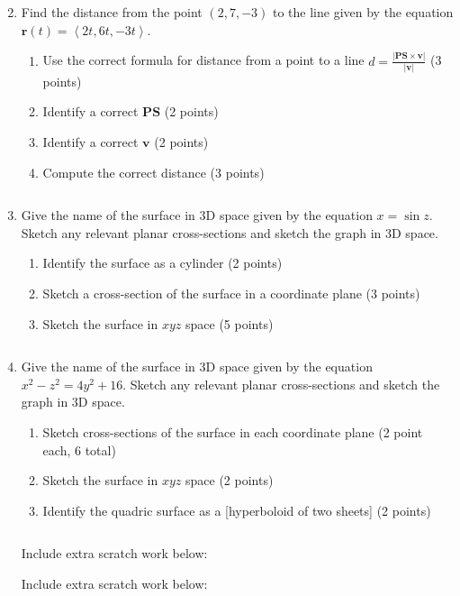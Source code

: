 \documentclass[12pt]{article}
\newcommand{\up}{$~$\vspace*{-0.7in}}
\newcommand{\liner}{\noindent\underline{\hspace*{7in}}}
\renewcommand{\vec}{\mathbf}
\newcommand{\<}{\left<}
\renewcommand{\>}{\right>}
\begin{document}
\begin{enumerate}
\vspace*{7.5in}

\liner
\newpage\up

\item Find the distance from the point $(2,7,-3)$ to the line given by the equation $\vec{r}(t)=\<2t,6t,-3t\>$.

\begin{enumerate}
\item Use the correct formula for distance from a point to a line $d = \frac{|\vec{PS}\times\vec{v}|}{|\vec{v}|}$ (3 points)
\item Identify a correct $\vec{PS}$ (2 points) 
\item Identify a correct $\vec{v}$ (2 points) 
\item Compute the correct distance (3 points)
\end{enumerate}

\vspace*{7.5in}

\liner
\newpage\up

\item Give the name of the surface in 3D space given by the equation $x=\sin z$. Sketch any relevant planar cross-sections and sketch the graph in 3D space.

\begin{enumerate}
\item Identify the surface as a cylinder (2 points) 
\item Sketch a cross-section of the surface in a coordinate plane (3 points) 
\item Sketch the surface in $xyz$ space (5 points)
\end{enumerate}

\vspace*{7.5in}

\liner
\newpage\up

\item Give the name of the surface in 3D space given by the equation $x^2-z^2=4y^2+16$. Sketch any relevant planar cross-sections and sketch the graph in 3D space.

\begin{enumerate}
\item Sketch cross-sections of the surface in each coordinate plane (2 point each, 6 total) 
\item Sketch the surface in $xyz$ space (2 points) 
\item Identify the quadric surface as a [hyperboloid of two sheets] (2 points)
\end{enumerate}

\vspace*{7.5in}

\liner
\newpage\up

\centerline{Include extra scratch work below:}
\liner
\newpage
\centerline{Include extra scratch work below:}
\liner
\newpage

\end{enumerate}
\end{document}
